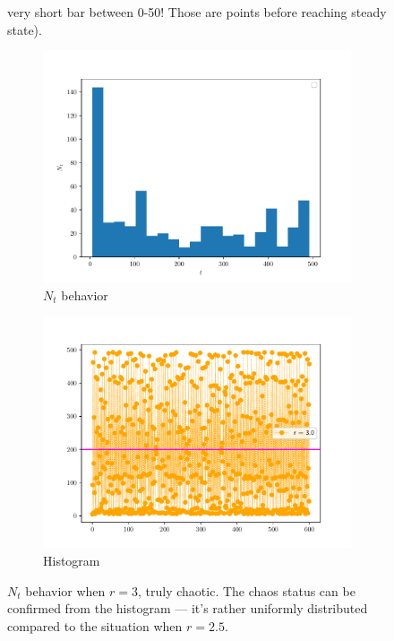 \begin{homeworkProblem}[4]
\begin{enumerate}
\begin{figure}[htbp]
{    very short bar between 0-50! Those are points before reaching steady state).}
    \label{fig:fig12}
    \vspace*{\floatsep}
    \begin{subfigure}[t]{0.4\linewidth}
        \centering
        \includegraphics[scale=0.5]{fig/fig4(d)(6).pdf}
        \caption{$N_t$ behavior}
    \end{subfigure}
    \hfill
    \begin{subfigure}[t]{0.4\linewidth}
        \centering
        \includegraphics[scale=0.5]{fig/fig4(d)(6)_chaos3.0.pdf}
        \caption{Histogram}
    \end{subfigure}
    \caption{$N_t$ behavior when $r = 3$, truly chaotic. The chaos status can
    be confirmed from the histogram --- it's rather uniformly distributed
    compared to the situation when $r = 2.5$.}
    \label{fig:fig13}
\end{figure}
\pagebreak
\end{enumerate}
\end{homeworkProblem}